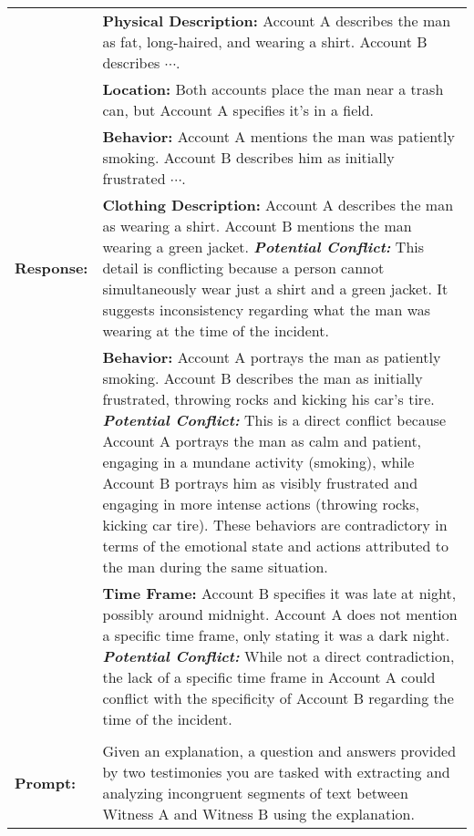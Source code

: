 \begin{table*}[ht]
{\begin{tabular}{|lp{62em}|}
        & \textbf{Physical Description:} Account A describes the man as fat, long-haired, and wearing a shirt. Account B describes $\cdots$. \\%
        & \textbf{Location:} Both accounts place the man near a trash can, but Account A specifies it's in a field.  \\
        & \textbf{Behavior:} Account A mentions the man was patiently smoking. Account B describes him as initially frustrated $\cdots$. \\ %
        \bf Response: & \textbf{Clothing Description:} Account A describes the man as wearing a shirt. Account B mentions the man wearing a green jacket. \textbf{\em Potential Conflict:} This detail is conflicting because a person cannot simultaneously wear just a shirt and a green jacket. It suggests inconsistency regarding what the man was wearing at the time of the incident.  \\
        & \textbf{Behavior:} Account A portrays the man as patiently smoking. Account B describes the man as initially frustrated, throwing rocks and kicking his car's tire. \textbf{\em Potential Conflict:} This is a direct conflict because Account A portrays the man as calm and patient, engaging in a mundane activity (smoking), while Account B portrays him as visibly frustrated and engaging in more intense actions (throwing rocks, kicking car tire). These behaviors are contradictory in terms of the emotional state and actions attributed to the man during the same situation.  \\
        & \textbf{Time Frame:} Account B specifies it was late at night, possibly around midnight. Account A does not mention a specific time frame, only stating it was a dark night. \textbf{\em Potential Conflict:} While not a direct contradiction, the lack of a specific time frame in Account A could conflict with the specificity of Account B regarding the time of the incident. \\ \bottomrule 
        \toprule
        \rowcolor{blue!30} \multicolumn{2}{|c|}{\bf Hop 3 -- Extracting Conflicting Spans} \\ \midrule
        \bf Prompt: & Given an explanation, a question and answers provided by two testimonies you are tasked with extracting and analyzing incongruent segments of text between Witness A and Witness B using the explanation. \\

\end{tabular}}
\end{table*}
